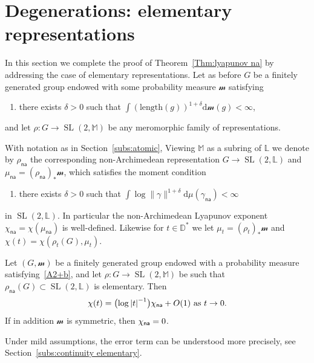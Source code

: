 \documentclass[AHL,Unicode,longabstracts]{cedram}
\DeclareMathOperator{\SL}{SL}
\newcommand{\sm}{\mathcal{m}}
\newcommand{\mm}{\mathbb{M}}
\newcommand{\D}{\mathbb{D}}
\newcommand{\cv}{\rightarrow}
\newcommand{\abs}[1]{\left\vert#1\right\vert}
\newcommand{\Laurent}{\mathbb{L}}
\newcommand{\na}{\mathsf{na}}
\newcommand{\inv}{^{-1}}
\newcommand*{\dd}{\mathrm{d}}
\newcommand*{\dmu}{\dd \mu}
\newcommand*{\dsm}{\dd \sm}
\begin{document}
\section{Degenerations: elementary representations}\label{sec:elem}

In this section we complete the proof of Theorem~\ref{Thm:lyapunov na} by addressing the case of elementary representations. Let as before $G$ be a finitely generated group endowed with some probability measure $\sm$ satisfying
\begin{enumerate}\renewcommand*{\theenumi}{A\arabic{enumi}${}^+$}\setcounter{enumi}{1}
\item \label{A2+b} there exists $\delta>0$ such that $\int (\mathrm{length}(g))^{1+\delta} \dsm(g)<\infty$,
\end{enumerate}
and let $\rho :G\to \SL(2, \mm)$ be any meromorphic family of representations.

With notation as in Section~\ref{subs:atomic}, Viewing $\mm$ as a subring of $\Laurent$ we denote by $\rho_\na$ the corresponding non-Archimedean representation $G\to \SL(2, \Laurent)$ and $\mu_\na = (\rho_\na)_* \sm$, which satisfies the moment condition
\begin{enumerate}\renewcommand*{\theenumi}{B\arabic{enumi}${}^+$}\setcounter{enumi}{1}
\item \label{B2+b} there exists $\delta>0$ such that $\int \log \|\gamma\|^{1+\delta} \dmu(\gamma_\na)<\infty$
\end{enumerate}
in $\SL(2, \Laurent)$. In particular the non-Archimedean Lyapunov exponent $\chi_\na = \chi(\mu_\na)$ is well-defined. Likewise for $t\in \D^*$ we let $\mu_t = (\rho_t)_* \sm$ and $\chi(t) = \chi(\rho_t(G), \mu_t)$.

\begin{theo} \label{thm:degeneration elementary}
Let $(G, \sm)$ be a finitely generated group endowed with a probability measure satisfying~\eqref{A2+b}, and let $\rho: G\to \SL(2, \mm)$ be such that $ \rho_\na(G) \subset \SL(2,\Laurent)$ is elementary. Then
\begin{equation}\label{eq:lyapunov elementary}
\chi(t) = \big({\log\abs{t}\inv} \big) \chi_{\sf na} + O(1) \text{ as } t\cv 0.
\end{equation}
If in addition $\sm$ is symmetric, then $\chi_{\sf na} = 0$.
\end{theo}

Under mild assumptions, the error term can be understood more precisely, see Section~\ref{subs:continuity elementary}.
\end{document}
